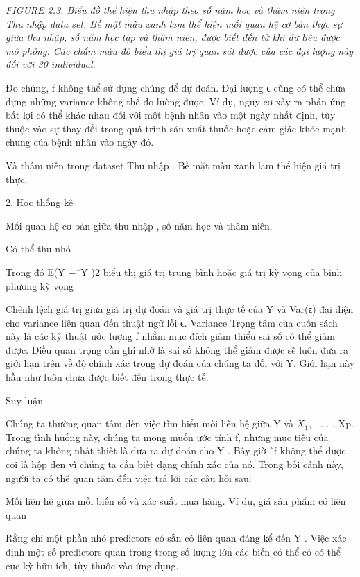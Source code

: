 \noindent\textit{FIGURE 2.3. Biểu đồ thể hiện thu nhập theo số năm học và thâm niên trong Thu nhập data set. Bề mặt màu xanh lam thể hiện mối quan hệ cơ bản thực sự giữa thu nhập, số năm học tập và thâm niên, được biết đến từ khi dữ liệu được mô phỏng. Các chấm màu đỏ biểu thị giá trị quan sát được của các đại lượng này đối với 30 individual.}

Đo chúng, f không thể sử dụng chúng để dự đoán. Đại lượng ϵ cũng có thể chứa đựng những variance không thể đo lường được. Ví dụ, nguy cơ xảy ra phản ứng bất lợi có thể khác nhau đối với một bệnh nhân vào một ngày nhất định, tùy thuộc vào sự thay đổi trong quá trình sản xuất thuốc hoặc cảm giác khỏe mạnh chung của bệnh nhân vào ngày đó.

Và thâm niên trong dataset Thu nhập . Bề mặt màu xanh lam thể hiện giá trị thực.

2. Học thống kê

Mối quan hệ cơ bản giữa thu nhập , số năm học và thâm niên.

Có thể thu nhỏ

Trong đó E(Y −ˆY )2 biểu thị giá trị trung bình hoặc giá trị kỳ vọng của bình phương kỳ vọng

Chênh lệch giá trị giữa giá trị dự đoán và giá trị thực tế của Y và Var(ϵ) đại diện cho variance liên quan đến thuật ngữ lỗi ϵ. Variance Trọng tâm của cuốn sách này là các kỹ thuật ước lượng f nhằm mục đích giảm thiểu sai số có thể giảm được. Điều quan trọng cần ghi nhớ là sai số không thể giảm được sẽ luôn đưa ra giới hạn trên về độ chính xác trong dự đoán của chúng ta đối với Y. Giới hạn này hầu như luôn chưa được biết đến trong thực tế.

Suy luận

Chúng ta thường quan tâm đến việc tìm hiểu mối liên hệ giữa Y và $X_{1}$, . . . , Xp. Trong tình huống này, chúng ta mong muốn ước tính f, nhưng mục tiêu của chúng ta không nhất thiết là đưa ra dự đoán cho Y . Bây giờ ˆf không thể được coi là hộp đen vì chúng ta cần biết dạng chính xác của nó. Trong bối cảnh này, người ta có thể quan tâm đến việc trả lời các câu hỏi sau:

Mối liên hệ giữa mỗi biến số và xác suất mua hàng. Ví dụ, giá sản phẩm có liên quan

Rằng chỉ một phần nhỏ predictors có sẵn có liên quan đáng kể đến Y . Việc xác định một số predictors quan trọng trong số lượng lớn các biến có thể có có thể cực kỳ hữu ích, tùy thuộc vào ứng dụng.

